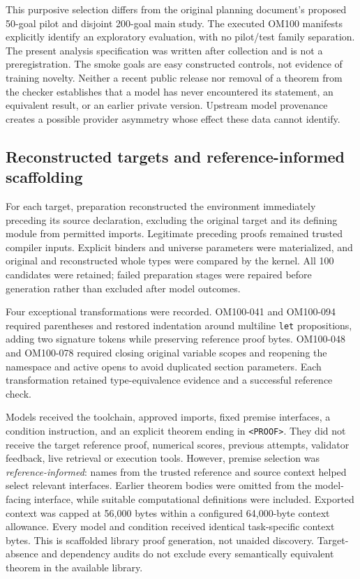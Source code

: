 This purposive selection differs from the original planning document's proposed 50-goal pilot and disjoint 200-goal main study. The executed OM100 manifests explicitly identify an exploratory evaluation, with no pilot/test family separation. The present analysis specification was written after collection and is not a preregistration. The smoke goals are easy constructed controls, not evidence of training novelty. Neither a recent public release nor removal of a theorem from the checker establishes that a model has never encountered its statement, an equivalent result, or an earlier private version. Upstream model provenance creates a possible provider asymmetry whose effect these data cannot identify.

\subsection{Reconstructed targets and reference-informed scaffolding}
\label{sec:methods-inputs}

For each target, preparation reconstructed the environment immediately preceding its source declaration, excluding the original target and its defining module from permitted imports. Legitimate preceding proofs remained trusted compiler inputs. Explicit binders and universe parameters were materialized, and original and reconstructed whole types were compared by the kernel. All 100 candidates were retained; failed preparation stages were repaired before generation rather than excluded after model outcomes.

Four exceptional transformations were recorded. OM100-041 and OM100-094 required parentheses and restored indentation around multiline \texttt{let} propositions, adding two signature tokens while preserving reference proof bytes. OM100-048 and OM100-078 required closing original variable scopes and reopening the namespace and active opens to avoid duplicated section parameters. Each transformation retained type-equivalence evidence and a successful reference check.

Models received the toolchain, approved imports, fixed premise interfaces, a condition instruction, and an explicit theorem ending in \texttt{<PROOF>}. They did not receive the target reference proof, numerical scores, previous attempts, validator feedback, live retrieval or execution tools. However, premise selection was \emph{reference-informed}: names from the trusted reference and source context helped select relevant interfaces. Earlier theorem bodies were omitted from the model-facing interface, while suitable computational definitions were included. Exported context was capped at 56,000 bytes within a configured 64,000-byte context allowance. Every model and condition received identical task-specific context bytes. This is scaffolded library proof generation, not unaided discovery. Target-absence and dependency audits do not exclude every semantically equivalent theorem in the available library.

